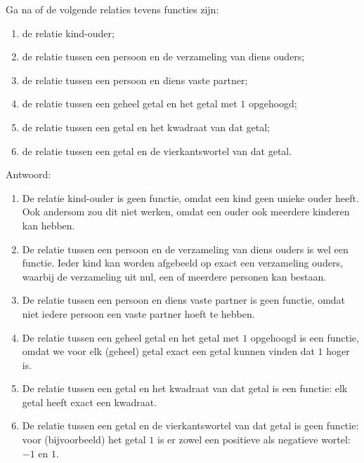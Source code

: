 \begin{answer}
  Ga na of de volgende relaties tevens functies zijn:\mbox{}\\
  \begin{enumerate}[label=\textbf{\alph*.}]
    \item de relatie kind-ouder;
    \item de relatie tussen een persoon en de verzameling van diens ouders;
    \item de relatie tussen een persoon en diens vaste partner;
    \item de relatie tussen een geheel getal en het getal met $1$ opgehoogd;
    \item de relatie tussen een getal en het kwadraat van dat getal;
    \item de relatie tussen een getal en de vierkantswortel van dat getal.
  \end{enumerate}
Antwoord:
  \begin{enumerate}[label=\textbf{\alph*.}]
    \item De relatie kind-ouder is geen functie, omdat een kind geen unieke ouder heeft. Ook andersom zou dit niet werken, omdat een ouder ook meerdere kinderen kan hebben.
    \item De relatie tussen een persoon en de verzameling van diens ouders is wel een functie. Ieder kind kan worden afgebeeld op exact een verzameling ouders, waarbij de verzameling uit nul, een of meerdere personen kan bestaan.
    \item De relatie tussen een persoon en diens vaste partner is geen functie, omdat niet iedere persoon een vaste partner hoeft te hebben.
    \item De relatie tussen een geheel getal en het getal met $1$ opgehoogd is een functie, omdat we voor elk (geheel) getal exact een getal kunnen vinden dat $1$ hoger is.
    \item De relatie tussen een getal en het kwadraat van dat getal is een functie: elk getal heeft exact een kwadraat.
    \item De relatie tussen een getal en de vierkantswortel van dat getal is geen functie: voor (bijvoorbeeld) het getal $1$ is er zowel een positieve als negatieve wortel: $-1$ en $1$.
  \end{enumerate}

\end{answer}

